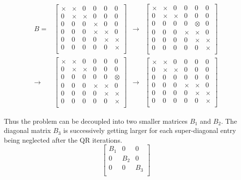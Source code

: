 \begin{align*}
B = &
\begin{bmatrix}
\times & \times & 0 & 0 & 0 & 0\\
0 & \times & \times & 0 & 0 & 0\\
0 & 0 & 0 & \times & 0 & 0\\
0 & 0 & 0 & \times & \times & 0\\
0 & 0 & 0 & 0 & \times & \times\\
0 & 0 & 0 & 0  & 0 & \times\\
\end{bmatrix}
&\rightarrow  &
\begin{bmatrix}
\times & \times & 0 & 0 & 0 & 0\\
0 & \times & \times & 0 & 0 & 0\\
0 & 0 & 0 & 0 & \otimes & 0\\
0 & 0 & 0 & \times & \times & 0\\
0 & 0 & 0 & 0 & \times & \times\\
0 & 0 & 0 & 0  & 0 & \times\\
\end{bmatrix}\\
\rightarrow &
\begin{bmatrix}
\times & \times & 0 & 0 & 0 & 0\\
0 & \times & \times & 0 & 0 & 0\\
0 & 0 & 0 & 0 & 0 & \otimes\\
0 & 0 & 0 & \times & \times & 0\\
0 & 0 & 0 & 0 & \times & \times\\
0 & 0 & 0 & 0  & 0 & \times\\
\end{bmatrix}
&\rightarrow &
\begin{bmatrix}
\times & \times & 0 & 0 & 0 & 0\\
0 & \times & \times & 0 & 0 & 0\\
0 & 0 & 0 & 0 & 0 & 0\\
0 & 0 & 0 & \times & \times & 0\\
0 & 0 & 0 & 0 & \times & \times\\
0 & 0 & 0 & 0  & 0 & \times\\
\end{bmatrix}
\end{align*}

Thus the problem can be decoupled into two smaller matrices $B_1$ and
$B_2$.  The diagonal matrix $B_3$ is successively getting larger for
each super-diagonal entry being neglected after the QR iterations.
\begin{equation}
\begin{bmatrix}
B_1 & 0 & 0\\
0 & B_2 & 0\\
0 & 0 & B_3\\
\end{bmatrix}
\end{equation}

